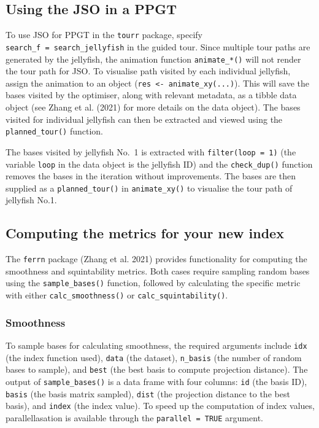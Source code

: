 \documentclass[
  12pt,
]{interact}
\theoremstyle{plain}
\begin{document}
\subsection{Using the JSO in a PPGT}\label{using-the-jso-in-a-ppgt}

To use JSO for PPGT in the \texttt{tourr} package, specify
\texttt{search\_f\ =\ search\_jellyfish} in the guided tour. Since
multiple tour paths are generated by the jellyfish, the animation
function \texttt{animate\_*()} will not render the tour path for JSO. To
visualise path visited by each individual jellyfish, assign the
animation to an object (\texttt{res\ \textless{}-\ animate\_xy(...)}).
This will save the bases visited by the optimiser, along with relevant
metadata, as a tibble data object (see Zhang et al. (2021) for more
details on the data object). The bases visited for individual jellyfish
can then be extracted and viewed using the \texttt{planned\_tour()}
function.

The bases visited by jellyfish No.~1 is extracted with
\texttt{filter(loop\ =\ 1)} (the variable \texttt{loop} in the data
object is the jellyfish ID) and the \texttt{check\_dup()} function
removes the bases in the iteration without improvements. The bases are
then supplied as a \texttt{planned\_tour()} in \texttt{animate\_xy()} to
visualise the tour path of jellyfish No.1.

\subsection{Computing the metrics for your new
index}\label{computing-the-metrics-for-your-new-index}

The \texttt{ferrn} package (Zhang et al. 2021) provides functionality
for computing the smoothness and squintability metrics. Both cases
require sampling random bases using the \texttt{sample\_bases()}
function, followed by calculating the specific metric with either
\texttt{calc\_smoothness()} or \texttt{calc\_squintability()}.

\subsubsection{Smoothness}\label{smoothness}

To sample bases for calculating smoothness, the required arguments
include \texttt{idx} (the index function used), \texttt{data} (the
dataset), \texttt{n\_basis} (the number of random bases to sample), and
\texttt{best} (the best basis to compute projection distance). The
output of \texttt{sample\_bases()} is a data frame with four columns:
\texttt{id} (the basis ID), \texttt{basis} (the basis matrix sampled),
\texttt{dist} (the projection distance to the best basis), and
\texttt{index} (the index value). To speed up the computation of index
values, parallellasation is available through the
\texttt{parallel\ =\ TRUE} argument.
\end{document}
